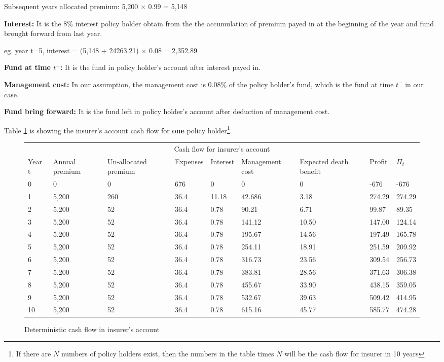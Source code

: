 \documentclass{report}
\begin{document}
Subsequent years allocated premium:   5,200 $\times$ 0.99 = 5,148


\textbf{Interest:} It is the 8\% interest policy holder obtain from the the accumulation of premium payed in at the beginning of the year and fund brought forward from last year.

eg.  year t=5, interest = (5,148 + 24263.21) $\times$ 0.08 = 2,352.89

\textbf{Fund at time $t^-$:} It is the fund in policy holder's account after interest payed in.

\textbf{Management cost:} In our assumption, the management cost is 0.08\% of the policy holder's fund, which is the fund at time $t^-$ in our case. 

\textbf{Fund bring forward:} It is the fund left in policy holder's account after deduction of management cost. 


Table \ref{determ-insurer} is showing the insurer's account cash flow for \textbf{one} policy holder\footnote{If there are $N$ numbers of policy holders exist, then the numbers in the table times $N$ will be the cash flow for insurer in 10 years}. 


\begin{figure}[H]
\hfill
\begin{tabular}{p{0.8cm} p{1.5cm} p{1.5cm} p{1.2cm} p{1cm} p{2cm}p{1.5cm} p{1.5cm} p{1.5cm} }
\toprule
\multicolumn{9}{c}{Cash flow for insurer's account} \\
\cmidrule(r){3-7}

Year t & Annual premium & Un-allocated premium & Expenses & Interest &Management cost& Expected death benefit & Profit& $\Pi_t$  \\
\midrule

0&0&0&676&0&0&0&-676&-676\\
1&5,200&260&36.4&11.18&42.686&3.18&274.29&274.29\\
2&5,200&52&36.4&0.78&90.21&6.71&99.87&89.35\\
3&5,200&52&36.4&0.78&141.12&10.50&147.00&124.14\\
4&5,200&52&36.4&0.78&195.67&14.56&197.49&165.78\\
5&5,200&52&36.4&0.78&254.11&18.91&251.59&209.92\\
6&5,200&52&36.4&0.78&316.73&23.56&309.54&256.73\\
7&5,200&52&36.4&0.78&383.81&28.56&371.63&306.38\\
8&5,200&52&36.4&0.78&455.67&33.90&438.15&359.05\\
9&5,200&52&36.4&0.78&532.67&39.63&509.42&414.95\\
10&5,200&52&36.4&0.78&615.16&45.77&585.77&474.28\\

\bottomrule
\end{tabular}
\caption{Deterministic cash flow in insurer's account}
\label{determ-insurer}
\end{figure}
\end{document}
